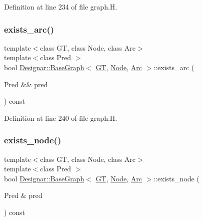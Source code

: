 Definition at line 234 of file graph.\+H.

\mbox{\label{class_designar_1_1_base_graph_aebf517d972db553b03f2c4dbe4228d79}} 
\subsubsection{\texorpdfstring{exists\+\_\+arc()}{exists\_arc()}\hspace{0.1cm}{\footnotesize\ttfamily [2/2]}}
{\footnotesize\ttfamily template$<$class GT, class Node, class Arc$>$ \\
template$<$class Pred $>$ \\
bool \hyperlink{class_designar_1_1_base_graph}{Designar\+::\+Base\+Graph}$<$ \hyperlink{demo-buildgraph_8_c_a3001c40d2c31ca87ed96cd7d1334a55e}{GT}, \hyperlink{namespace_designar_a5af326c65aa2bd26b26c410f2030d09e}{Node}, \hyperlink{namespace_designar_a3f55fb5513d62ff47cbc8f72b8e95d6f}{Arc} $>$\+::exists\+\_\+arc (\begin{DoxyParamCaption}\item[{Pred \&\&}]{pred }\end{DoxyParamCaption}) const\hspace{0.3cm}{\ttfamily [inline]}}



Definition at line 240 of file graph.\+H.

\mbox{\label{class_designar_1_1_base_graph_a3631470de61b819211c72fdd2ac31b34}} 
\subsubsection{\texorpdfstring{exists\+\_\+node()}{exists\_node()}\hspace{0.1cm}{\footnotesize\ttfamily [1/2]}}
{\footnotesize\ttfamily template$<$class GT, class Node, class Arc$>$ \\
template$<$class Pred $>$ \\
bool \hyperlink{class_designar_1_1_base_graph}{Designar\+::\+Base\+Graph}$<$ \hyperlink{demo-buildgraph_8_c_a3001c40d2c31ca87ed96cd7d1334a55e}{GT}, \hyperlink{namespace_designar_a5af326c65aa2bd26b26c410f2030d09e}{Node}, \hyperlink{namespace_designar_a3f55fb5513d62ff47cbc8f72b8e95d6f}{Arc} $>$\+::exists\+\_\+node (\begin{DoxyParamCaption}\item[{Pred \&}]{pred }\end{DoxyParamCaption}) const\hspace{0.3cm}{\ttfamily [inline]}}



